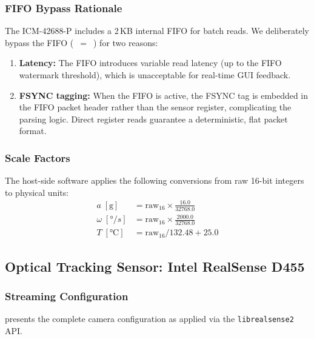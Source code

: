 \subsubsection{FIFO Bypass Rationale}
The ICM-42688-P includes a 2\,KB internal FIFO for batch reads.
We deliberately bypass the FIFO (~$=$~) for two reasons:
\begin{enumerate}[nosep]
  \item \textbf{Latency:} The FIFO introduces variable read latency (up to the FIFO watermark threshold), which is unacceptable for real-time GUI feedback.
  \item \textbf{FSYNC tagging:} When the FIFO is active, the FSYNC tag is embedded in the FIFO packet header rather than the sensor register, complicating the parsing logic. Direct register reads guarantee a deterministic, flat packet format.
\end{enumerate}

\subsubsection{Scale Factors}
The host-side software applies the following conversions from raw 16-bit integers to physical units:
\begin{align}
  a\;[\si{\g}]              &= \text{raw}_{16} \times \frac{16.0}{32768.0} \label{eq:accel_scale}\\
  \omega\;[\si{\degree/s}]  &= \text{raw}_{16} \times \frac{2000.0}{32768.0} \label{eq:gyro_scale}\\
  T\;[\si{\celsius}]        &= \text{raw}_{16} / 132.48 + 25.0 \label{eq:temp_scale}
\end{align}


\subsection{Optical Tracking Sensor: Intel RealSense D455}

\subsubsection{Streaming Configuration}

 presents the complete camera configuration as applied via the \texttt{librealsense2} API.

